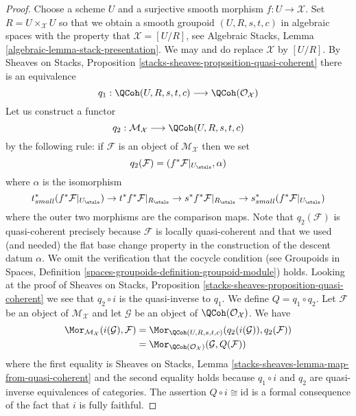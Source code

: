 \begin{proof}
Choose a scheme $U$ and a surjective smooth morphism $f : U \to \mathcal{X}$.
Set $R = U \times_\mathcal{X} U$ so that we obtain a smooth groupoid
$(U, R, s, t, c)$ in algebraic spaces with the property that
$\mathcal{X} = [U/R]$, see
Algebraic Stacks, Lemma \ref{algebraic-lemma-stack-presentation}.
We may and do replace $\mathcal{X}$ by $[U/R]$. By
Sheaves on Stacks, Proposition \ref{stacks-sheaves-proposition-quasi-coherent}
there is an equivalence
$$
q_1 :
\QCoh(U, R, s, t, c)
\longrightarrow
\QCoh(\mathcal{O}_\mathcal{X})
$$
Let us construct a functor
$$
q_2 :
\mathcal{M}_\mathcal{X}
\longrightarrow
\QCoh(U, R, s, t, c)
$$
by the following rule: if $\mathcal{F}$ is an object of
$\mathcal{M}_\mathcal{X}$ then we set
$$
q_2(\mathcal{F}) = (f^*\mathcal{F}|_{U_\etale}, \alpha)
$$
where $\alpha$ is the isomorphism
$$
t_{small}^*(f^*\mathcal{F}|_{U_\etale})
\to
t^*f^*\mathcal{F}|_{R_\etale} \to
s^*f^*\mathcal{F}|_{R_\etale} \to
s_{small}^*(f^*\mathcal{F}|_{U_\etale})
$$
where the outer two morphisms are the comparison maps. Note that
$q_2(\mathcal{F})$ is quasi-coherent precisely because $\mathcal{F}$ is
locally quasi-coherent and that we used (and needed)
the flat base change property in the construction of
the descent datum $\alpha$. We omit the
verification that the cocycle condition (see
Groupoids in Spaces, Definition
\ref{spaces-groupoids-definition-groupoid-module})
holds. Looking at the proof of
Sheaves on Stacks, Proposition \ref{stacks-sheaves-proposition-quasi-coherent}
we see that $q_2 \circ i$ is the quasi-inverse to $q_1$.
We define $Q = q_1 \circ q_2$.
Let $\mathcal{F}$ be an object of $\mathcal{M}_\mathcal{X}$ and
let $\mathcal{G}$ be an object of $\QCoh(\mathcal{O}_\mathcal{X})$.
We have
\begin{align*}
\Mor_{\mathcal{M}_\mathcal{X}}(i(\mathcal{G}), \mathcal{F})
& =
\Mor_{\QCoh(U, R, s, t, c)}(q_2(i(\mathcal{G})), q_2(\mathcal{F})) \\
& =
\Mor_{\QCoh(\mathcal{O}_\mathcal{X})}(\mathcal{G}, Q(\mathcal{F}))
\end{align*}
where the first equality is
Sheaves on Stacks, Lemma \ref{stacks-sheaves-lemma-map-from-quasi-coherent}
and the second equality holds because $q_1 \circ i$ and $q_2$ are quasi-inverse
equivalences of categories. The assertion $Q \circ i \cong \text{id}$
is a formal consequence of the fact that $i$ is fully faithful.
\end{proof}

